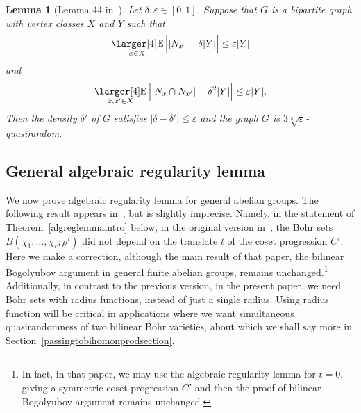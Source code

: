 \documentclass[a4paper,11pt]{article}
\numberwithin{theorem}{section}
\newtheorem{lemma}[theorem]{Lemma}
\theoremstyle{definition}
\newcommand{\exx}{
  \mathop{
    \mathchoice{\vcenter{\hbox{\larger[4]$\mathbb{E}$}}}
               {\kern0pt\mathbb{E}}
               {\kern0pt\mathbb{E}}
               {\kern0pt\mathbb{E}}
  }\displaylimits
}
\begin{document}
\begin{lemma}[Lemma 44 in~\cite{generalBilBog}]\label{appendonesided}Let $\delta,\varepsilon \in [0,1]$. Suppose that $G$ is a bipartite graph with vertex classes $X$ and $Y$ such that
\begin{equation}\label{qrCond1}\exx_{x \in X} \Big||N_x| - \delta |Y|\Big| \leq \varepsilon |Y|\end{equation}
and 
\begin{equation}\exx_{x, x' \in X} \Big||N_x \cap N_{x'}| - \delta^2 |Y|\Big| \leq \varepsilon |Y|.\label{qrCond2}\end{equation}
Then the density $\delta'$ of $G$ satisfies $|\delta - \delta'| \leq \varepsilon$ and the graph $G$ is $3 \sqrt[8]{\varepsilon}$-quasirandom.\end{lemma}

\subsection{General algebraic regularity lemma}

We now prove algebraic regularity lemma for general abelian groups. The following result appears in~\cite{generalBilBog}, but is slightly imprecise. Namely, in the statement of Theorem~\ref{algreglemmaintro} below, in the original version in~\cite{generalBilBog}, the Bohr sets $B(\chi_1, \dots, \chi_r; \rho')$ did not depend on the translate $t$ of the coset progression $C'$. Here we make a correction, although the main result of that paper, the bilinear Bogolyubov argument in general finite abelian groups, remains unchanged.\footnote{In fact, in that paper, we may use the algebraic regularity lemma for $t= 0$, giving a symmetric coset progression $C'$ and then the proof of bilinear Bogolyubov argument remains unchanged.} Additionally, in contrast to the previous version, in the present paper, we need Bohr sets with radius functions, instead of just a single radius. Using radius function will be critical in applications where we want simultaneous quasirandomness of two bilinear Bohr varieties, about which we shall say more in Section~\ref{passingtobihomonprodsection}.
\end{document}

